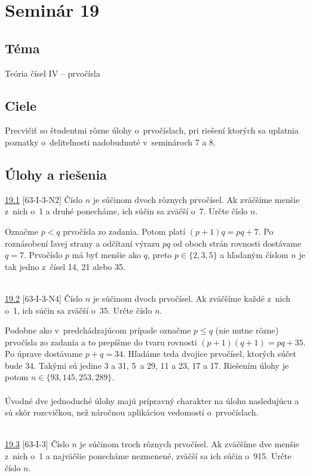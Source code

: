 \section*{Seminár 19}
\subsection*{Téma}
Teória čísel IV -- prvočísla

\subsection*{Ciele}
Precvičiť so študentmi rôzne úlohy o~prvočíslach, pri riešení ktorých sa uplatnia poznatky o~deliteľnosti nadobudnuté v~seminároch 7 a 8.

\subsection*{Úlohy a riešenia}
\begin{tcolorbox}[breakable,notitle,boxrule=0pt,colback=light-gray,colframe=light-gray]\ul{19.1} [63-I-3-N2] Číslo $n$ je súčinom dvoch rôznych prvočísel. Ak zväčšíme menšie z~nich o~1 a druhé ponecháme, ich súčin sa zväčší o~7. Určte číslo $n$.

\end{tcolorbox}

\rie Označme $p<q$ prvočísla zo zadania. Potom platí $(p+1)q=pq+7$. Po roznásobení ľavej strany a odčítaní výrazu $pq$ od oboch strán rovnosti dostávame $q=7$. Prvočíslo $p$ má byť menšie ako $q$, preto $p\in \{2,3,5\}$ a hľadaným číslom $n$ je tak jedno z~čísel 14, 21 alebo 35.\\
\\
\begin{tcolorbox}[breakable,notitle,boxrule=0pt,colback=light-gray,colframe=light-gray]\ul{19.2} [63-I-3-N4] Číslo $n$ je súčinom dvoch prvočísel. Ak zväčšíme každé z~nich o~1, ich súčin sa zväčší o~35. Určte číslo $n$.

\end{tcolorbox}

\rie Podobne ako v~predchádzajúcom prípade označme $p\leq q$ (nie nutne rôzne) prvočísla zo zadania a to prepíšme do tvaru rovnosti $(p+1)(q+1)=pq+35$. Po úprave dostávame $p+q=34$. Hľadáme teda dvojice prvočísel, ktorých súčet bude 34. Takými sú jedine 3 a 31, 5~a 29, 11 a 23, 17 a 17. Riešením úlohy je potom $n \in \{93, 145, 253, 289\}$.\\
\\
\kom Úvodné dve jednoduché úlohy majú prípravný charakter na úlohu nasledujúcu a sú skôr rozcvičkou, než náročnou aplikáciou vedomostí o~prvočíslach.\\
\\
\begin{tcolorbox}[breakable,notitle,boxrule=0pt,colback=light-gray,colframe=light-gray]\ul{19.3} [63-I-3]
Číslo $n$ je súčinom troch rôznych prvočísel. Ak zväčšíme dve menšie z~nich o~1 a najväčšie ponecháme nezmenené, zväčší sa ich súčin o~915. Určte číslo $n$.

\end{tcolorbox}

